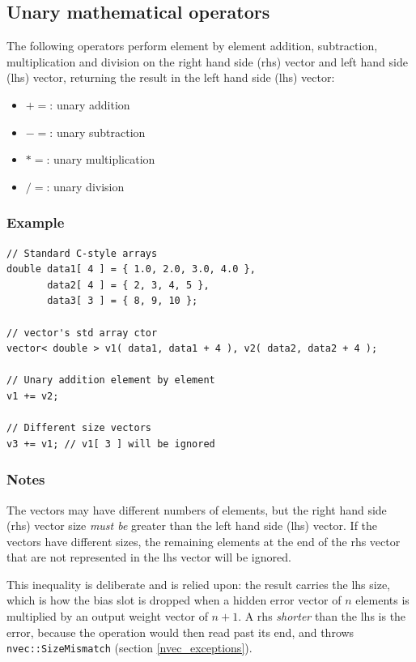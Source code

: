 \documentclass{report}
\begin{document}
\subsection{Unary mathematical operators}

The following operators perform element by element addition,
subtraction, multiplication and division on the right hand side (rhs)
vector and left hand side (lhs) vector, returning the result in the
left hand side (lhs) vector:

\begin{itemize}
\item $+=$: unary addition
\item $-=$: unary subtraction
\item $*=$: unary multiplication
\item $/=$: unary division
\end{itemize}

\subsubsection{Example}

\begin{verbatim}
// Standard C-style arrays
double data1[ 4 ] = { 1.0, 2.0, 3.0, 4.0 },
       data2[ 4 ] = { 2, 3, 4, 5 },
       data3[ 3 ] = { 8, 9, 10 };

// vector's std array ctor
vector< double > v1( data1, data1 + 4 ), v2( data2, data2 + 4 );

// Unary addition element by element
v1 += v2;

// Different size vectors
v3 += v1; // v1[ 3 ] will be ignored
\end{verbatim}

\subsubsection{Notes}
The vectors may have different numbers of elements, but the right hand
side (rhs) vector size {\em must be} greater than the left hand side
(lhs) vector.  If the vectors have different sizes, the remaining
elements at the end of the rhs vector that are not represented in the
lhs vector will be ignored.

This inequality is deliberate and is relied upon: the result carries
the lhs size, which is how the bias slot is dropped when a hidden
error vector of $n$ elements is multiplied by an output weight vector
of $n+1$.  A rhs {\em shorter} than the lhs is the error, because the
operation would then read past its end, and throws
\texttt{nvec::SizeMismatch} (section \ref{nvec_exceptions}).
\end{document}
